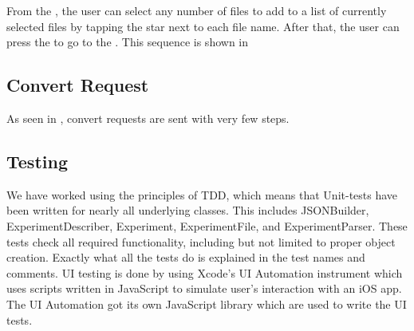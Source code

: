 From the , the user can select any number of files to add to a list of currently selected files by tapping the star next to each file name. After that, the user can press the  to go to the . This sequence is shown in 


\subsection{Convert Request}

As seen in , convert requests are sent with very few steps. 


\subsection{Testing}

We have worked using the principles of TDD, which means that Unit-tests have been written for nearly all underlying classes. This includes JSONBuilder, ExperimentDescriber, Experiment, ExperimentFile, and ExperimentParser. These tests check all required functionality, including but not limited to proper object creation. Exactly what all the tests do is explained in the test names and comments. UI testing is done by using Xcode's UI Automation instrument which uses scripts written in JavaScript to simulate user's interaction with an iOS app. The UI Automation got its own JavaScript library which are used to write the UI tests.
